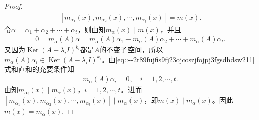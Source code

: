 \documentclass[../../main.tex]{subfiles}%
\begin{document}
\begin{proof}
\begin{align*}
\left[m_{\alpha_1}(x),m_{\alpha_2}(x),\cdots,m_{\alpha_t}(x)\right]=m(x).
\end{align*}
令$\alpha=\alpha_1+\alpha_2+\cdots+\alpha_t$，则由知$m_{\alpha}(x)\mid m(x)$，并且
\begin{align*}
0=m_{\alpha}(A)\alpha=m_{\alpha}(A)\alpha_1+m_{\alpha}(A)\alpha_2+\cdots+m_{\alpha}(A)\alpha_t.
\end{align*}
又因为$\operatorname{Ker}(A-\lambda_iI)^{k_i}$都是$A$的不变子空间，所以$m_{\alpha}(A)\alpha_i\in\operatorname{Ker}(A-\lambda_iI)^{k_i}$。由\eqref{eq::--2r89fujfis9fj23ojcoszjfojpj3fgsdhdsw211}式和直和的充要条件知
\begin{align*}
m_{\alpha}(A)\alpha_i=0,\quad i=1,2,\cdots,t.
\end{align*}
由知$m_{\alpha_i}(x)\mid m_{\alpha}(x)$，$i=1,2,\cdots,t$。进而$\left[m_{\alpha_1}(x),m_{\alpha_2}(x),\cdots,m_{\alpha_t}(x)\right]\mid m_{\alpha}(x)$，即$m(x)\mid m_{\alpha}(x)$。因此$m(x)=m_{\alpha}(x)$.

\end{proof}
\end{document}
